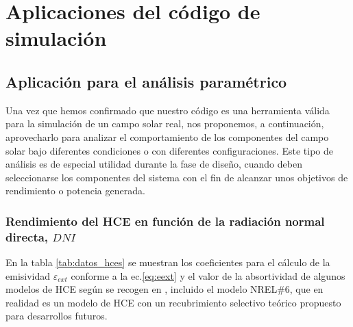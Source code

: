 \chapter{Aplicaciones del código de simulación}
\label{aplicaciones}

\section{Aplicación para el análisis paramétrico}
\label{analisis-parametrico}

Una vez que hemos confirmado que nuestro código es una herramienta válida para la simulación de un campo solar real, nos proponemos, a continuación, aprovecharlo para analizar el comportamiento de los componentes del campo solar bajo diferentes condiciones o con diferentes configuraciones. Este tipo de análisis es de especial utilidad durante la fase de diseño, cuando deben seleccionarse los componentes del sistema con el fin de alcanzar unos objetivos de rendimiento o potencia generada.

\subsection{Rendimiento del HCE en función de la radiación normal directa, $DNI$}

En la tabla \ref{tab:datos_hces} se muestran los coeficientes para el cálculo de la emisividad $\varepsilon_{ext}$ conforme a la ec.\eqref{eq:eext} y el valor de la absortividad de algunos modelos de HCE según se recogen en \cite{barberofresnoDesarrolloModeloTeorico2018}, incluido el modelo NREL\#6, que en realidad es un modelo de HCE con un recubrimiento selectivo teórico propuesto para desarrollos futuros.

\begin{table}[H]
\centering
\caption[Constantes del modelo de emisividad equivalente para cada uno de los receptores seleccionados]{Constantes del modelo de emisividad equivalente para cada uno de los receptores seleccionados. *Al no disponerse de este dato, se ha empleado este valor con el fin de poder incluir el modelo en el test. Fuente \cite{barberofresnoDesarrolloModeloTeorico2018}}
\label{tab:datos_hces}
\end{table}

